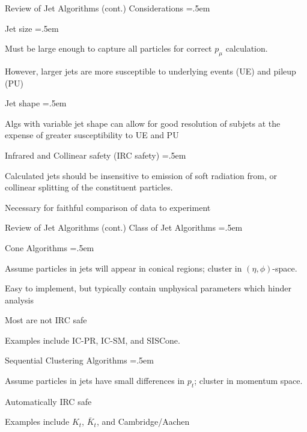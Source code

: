 \documentclass[xcolor={dvipsnames}]{beamer}
\let\olditemize=\itemize
\let\endolditemize=\enditemize
\renewenvironment{itemize}{\olditemize \itemsep=.5em }{\endolditemize}
\begin{document}
\begin{frame}{Review of Jet Algorithms (cont.)}
\alert{Considerations}
\begin{itemize}
    \item<2-> Jet size
    \begin{itemize}
        \item<3-> Must be large enough to capture all particles for correct $p_\mu$ calculation.
        \item<4-> However, larger jets are more susceptible to underlying events (UE) and pileup (PU)
    \end{itemize}
    \item<5-> Jet shape
    \begin{itemize}
        \item<6-> Algs with variable jet shape can allow for good resolution of subjets at the expense of greater susceptibility to UE and PU
    \end{itemize}
    \item<7-> Infrared and Collinear safety (IRC safety)
    \begin{itemize}
        \item<8-> Calculated jets should be insensitive to emission of soft radiation from, or collinear splitting of the constituent particles.
        \item<9-> Necessary for faithful comparison of data to experiment
    \end{itemize}
\end{itemize}
\end{frame}

\begin{frame}{Review of Jet Algorithms (cont.)}
\alert{Class of Jet Algorithms}
\begin{itemize}
    \item<2-> Cone Algorithms
    \begin{itemize}
        \item<3-> Assume particles in jets will appear in conical regions; cluster in $(\eta, \phi)$-space.
        \item<4-> Easy to implement, but typically contain unphysical parameters which hinder analysis
        \item<5-> Most are not IRC safe
        \item<6-> Examples include IC-PR, IC-SM, and SISCone.
    \end{itemize}
    \item<7-> Sequential Clustering Algorithms
    \begin{itemize}
        \item<8-> Assume particles in jets have small differences in $p_t$; cluster in momentum space.
        \item<9-> Automatically IRC safe
        \item<10-> Examples include $K_t$, $\bar{K}_t$, and Cambridge/Aachen
    \end{itemize}
\end{itemize}
\end{frame}
\end{document}
